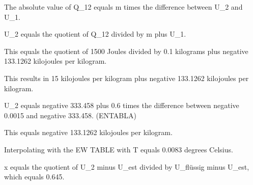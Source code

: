 The absolute value of Q_12 equals m times the difference between U_2 and U_1.

U_2 equals the quotient of Q_12 divided by m plus U_1.

This equals the quotient of 1500 Joules divided by 0.1 kilograms plus negative 133.1262 kilojoules per kilogram.

This results in 15 kilojoules per kilogram plus negative 133.1262 kilojoules per kilogram.

U_2 equals negative 333.458 plus 0.6 times the difference between negative 0.0015 and negative 333.458. (ENTABLA)

This equals negative 133.1262 kilojoules per kilogram.

Interpolating with the EW TABLE with T equals 0.0083 degrees Celsius.

x equals the quotient of U_2 minus U_est divided by U_flüssig minus U_est, which equals 0.645.